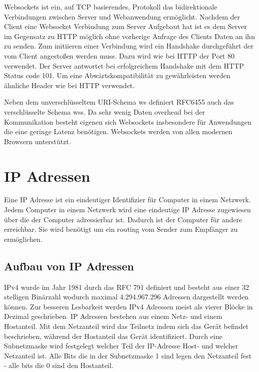 Websockets ist ein, auf TCP basierendes, Protokoll das bidirektionale Verbindungen zwischen Server und Webanwendung ermöglicht. Nachdem der Client eine Websocket Verbindung zum Server Aufgebaut hat ist es dem Server im Gegensatz zu HTTP möglich ohne vorherige Anfrage des Clients Daten an ihn zu senden. Zum initiieren einer Verbindung wird ein Handshake durchgeführt der vom Client angestoßen werden muss. Dazu wird wie bei HTTP der Port 80 verwendet. Der Server antwortet bei erfolgreichem Handshake mit dem HTTP Status code 101. Um eine Abwärtskompatibilität zu gewährleisten werden ähnliche Header wie bei HTTP verwendet.

Neben dem unverschlüsseltem URI-Schema ws definiert RFC6455\cite{rfcWebsockets} auch das verschlüsselte Schema wss. Da  sehr wenig Daten overhead bei der Kommunikation besteht eigenen sich Websockets insbesondere für Anwendungen die eine geringe Latenz benötigen. Websockets werden von allen modernen Browsern unterstützt.

%
%
%
% 
%  

\section{IP Adressen}
Eine IP Adresse ist ein eindeutiger Identifizier für Computer in einem Netzwerk. Jedem Computer in einem Netzwerk wird eine eindeutige IP Adresse zugewiesen über die der Computer adressierbar ist. Dadurch ist der Computer für andere erreichbar. Sie wird benötigt um ein routing vom Sender zum Empfänger zu ermöglichen. \cite{www}
\subsection{Aufbau von IP Adressen}
IPv4 wurde im Jahr 1981 durch das RFC 791\cite{rfc791} definiert und besteht aus einer 32 stelligen Binärzahl wodurch maximal 4.294.967.296 Adressen dargestellt werden können. Zur besseren Lesbarkeit werden IPv4 Adressen meist als vierer Blöcke in Dezimal geschrieben. IP Adressen bestehen aus einem Netz- und einem Hostanteil. Mit dem Netzanteil wird das Teilnetz indem sich das Gerät befindet beschrieben, während der Hostanteil das Gerät identifiziert. Durch eine Subnetzmaske wird festgelegt welcher Teil der IP-Adresse Host- und welcher Netzanteil ist. Alle Bits die in der Subnetzmaske 1 sind legen den Netzanteil fest - alle bits die 0 sind den Hostanteil.

